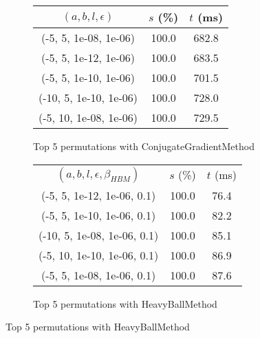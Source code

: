 \begin{figure}[H]
\begin{subfigure}[ht]{.5\textwidth}
\begin{tabular}{|c|c|c|}
\hline
\rowcolor{gray!25}
$(a,b,l,\epsilon)$ & $s$ (\%) & $t$ (ms) \\
\hline
(-5, 5, 1e-08, 1e-06) & 100.0 & 682.8 \\
(-5, 5, 1e-12, 1e-06) & 100.0 & 683.5 \\
(-5, 5, 1e-10, 1e-06) & 100.0 & 701.5 \\
(-10, 5, 1e-10, 1e-06) & 100.0 & 728.0 \\
(-5, 10, 1e-08, 1e-06) & 100.0 & 729.5 \\
\hline
\end{tabular}
\caption{Top 5 permutations with ConjugateGradientMethod}
\label{subfig:param_comp_NegativeEntropy_ConjugateGradientMethod_FibonacciSearch}
\end{subfigure}
\hfill
\begin{subfigure}[ht]{.5\textwidth}
\begin{tabular}{|c|c|c|}
\hline
\rowcolor{gray!25}
\multicolumn{3}{|c|}{HeavyBallMethod} \\
\hline
\rowcolor{gray!25}
$(a,b,l,\epsilon,\beta_{HBM})$ & $s$ (\%) & $t$ (ms) \\
\hline
(-5, 5, 1e-12, 1e-06, 0.1) & 100.0 & 76.4 \\
(-5, 5, 1e-10, 1e-06, 0.1) & 100.0 & 82.2 \\
(-10, 5, 1e-08, 1e-06, 0.1) & 100.0 & 85.1 \\
(-5, 10, 1e-10, 1e-06, 0.1) & 100.0 & 86.9 \\
(-5, 5, 1e-08, 1e-06, 0.1) & 100.0 & 87.6 \\
\hline
\end{tabular}
\caption{Top 5 permutations with HeavyBallMethod}
\label{subfig:param_comp_NegativeEntropy_HeavyBallMethod_FibonacciSearch}
\end{subfigure}
\end{figure}